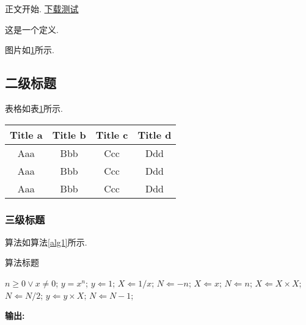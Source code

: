 \documentclass{SCIS2023cn}
\begin{document}
正文开始. \href{https://mc03.manuscriptcentral.com/scis}{下载测试}

\begin{definition}\label{def1}
这是一个定义.
\end{definition}

\newpage

图片如\ref{fig1}所示.
\begin{figure}[!t]
\centering
\label{fig1}
\end{figure}

\subsection{二级标题}
表格如表\ref{tab1}所示.
\begin{table}[!t]
\label{tab1}
\footnotesize
\tabcolsep 49pt %
\begin{tabular*}{\textwidth}{cccc}
\toprule
  Title a & Title b & Title c & Title d \\\hline
  Aaa & Bbb & Ccc & Ddd\\
  Aaa & Bbb & Ccc & Ddd\\
  Aaa & Bbb & Ccc & Ddd\\
\bottomrule
\end{tabular*}
\end{table}

\subsubsection{三级标题}
算法如算法\ref{alg1}所示.
\begin{algorithm}
\renewcommand{\algorithmicrequire}{\textbf{输入:}}%
\renewcommand{\algorithmicensure}{\textbf{主迭代:}}%
\newcommand{\LASTCON}{\item[\algorithmiclastcon]}
\newcommand{\algorithmiclastcon}{\textbf{输出:}}%
\footnotesize
\caption{算法标题}
\label{alg1}
\begin{algorithmic}[1]
    \REQUIRE $n \geq 0 \vee x \neq 0$;
    \ENSURE $y = x^n$;
    \STATE $y \Leftarrow 1$;
        \STATE $X \Leftarrow 1 / x$;
        \STATE $N \Leftarrow -n$;
    \ELSE
        \STATE $X \Leftarrow x$;
        \STATE $N \Leftarrow n$;
    \ENDIF
            \STATE $X \Leftarrow X \times X$;
            \STATE $N \Leftarrow N / 2$;
        \ELSE[$N$ is odd]
            \STATE $y \Leftarrow y \times X$;
            \STATE $N \Leftarrow N - 1$;
        \ENDIF
    \ENDWHILE
    \LASTCON
\end{algorithmic}
\end{algorithm}
\end{document}
